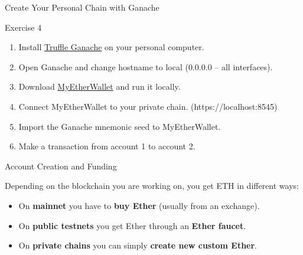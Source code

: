 \documentclass[]{beamer}
\begin{document}
\begin{frame}{Create Your Personal Chain with Ganache}
\begin{exercise}{Exercise 4}
		\begin{enumerate}
			\item Install \href{https://www.trufflesuite.com/ganache}{\link Truffle Ganache} on your personal computer.
			\item Open Ganache and change hostname to local (0.0.0.0 -- all interfaces).
			\item Download \href{https://github.com/MyEtherWallet/etherwallet\#download-the-latest-release}{\link MyEtherWallet} and run it locally.
			\item Connect MyEtherWallet to your private chain. (https://localhost:8545)
			\item Import the Ganache mnemonic seed to MyEtherWallet.
			\item Make a transaction from account 1 to account 2.
		\end{enumerate}
	\end{exercise}
\end{frame}

\begin{frame}{Account Creation and Funding}

	\begin{figure}
		\begingroup
			
		\endgroup
	\end{figure}
	
	Depending on the blockchain you are working on, you get ETH in different ways:\\
	
	\begin{itemize}
		\item<1-> On \textbf{mainnet} you have to \textbf{buy Ether}	 (usually from an exchange).
		\item<2-> On \textbf{public testnets} you get Ether through an \textbf{Ether faucet}.
		\item<3-> On \textbf{private chains} you can simply \textbf{create new custom Ether}.
	\end{itemize}
	\vspace{1em}
\end{frame}
\end{document}
